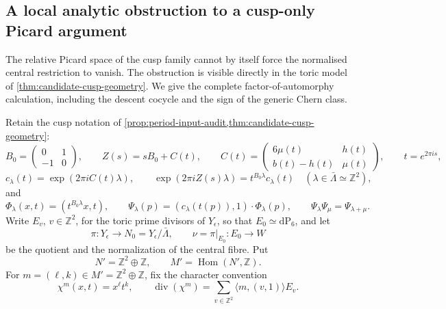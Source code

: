 \subsection{A local analytic obstruction to a cusp-only Picard argument}
\label{subsec:local-cusp-picard-obstruction}

The relative Picard space of the cusp family cannot by itself force the
normalised central restriction to vanish.  The obstruction is visible
directly in the toric model of \cref{thm:candidate-cusp-geometry}.  We give
the complete factor-of-automorphy calculation, including the descent
cocycle and the sign of the generic Chern class.

Retain the cusp notation of
\cref{prop:period-input-audit,thm:candidate-cusp-geometry}:
\[
 B_0=\begin{pmatrix}0&1\\-1&0\end{pmatrix},
 \qquad
 Z(s)=sB_0+C(t),
 \qquad
 C(t)=\begin{pmatrix}6\mu(t)&h(t)\\ b(t)-h(t)&\mu(t)\end{pmatrix},
 \qquad t=e^{2\pi i s},
\tag{5.17t}
\]
\[
 c_{\lambda}(t)=\exp(2\pi iC(t)\lambda),
 \qquad
 \exp(2\pi iZ(s)\lambda)=t^{B_0\lambda}c_\lambda(t)
 \quad(\lambda\in\bar\Lambda\simeq\mathbb Z^2),
\tag{5.17u}
\]
and
\[
 \Phi_\lambda(x,t)=(t^{B_0\lambda}x,t),
 \qquad
 \Psi_\lambda(p)=(c_\lambda(t(p)),1)\cdot\Phi_\lambda(p),
 \qquad
 \Psi_\lambda\Psi_\mu=\Psi_{\lambda+\mu}.
\tag{5.17v}
\]
Write \(E_v\), \(v\in\mathbb Z^2\), for the toric prime divisors of
\(Y_\epsilon\), so that \(E_0\simeq\mathrm{dP}_6\), and let
\[
 \pi:Y_\epsilon\longrightarrow N_0=Y_\epsilon/\bar\Lambda,
 \qquad
 \nu=\pi|_{E_0}:E_0\longrightarrow W
\]
be the quotient and the normalization of the central fibre.
Put
\[
 N'=\mathbb Z^2\oplus\mathbb Z,
 \qquad
 M'=\operatorname{Hom}(N',\mathbb Z).
\]
For \(m=(\ell,k)\in M'=\mathbb Z^2\oplus\mathbb Z\), fix the character
convention
\[
 \chi^m(x,t)=x^\ell t^k,
 \qquad
 \operatorname{div}(\chi^m)=
 \sum_{v\in\mathbb Z^2}\langle m,(v,1)\rangle E_v.
\tag{5.17w}
\]

